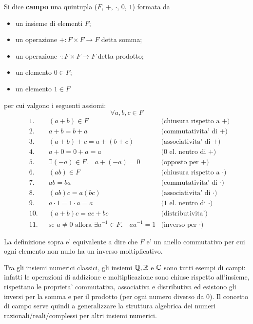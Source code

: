 \begin{definition}
    Si dice \textbf{campo} una quintupla ($F$, $+$, $\cdot$, $0$, $1$) formata da
    \begin{itemize}
        \item un insieme di elementi $F$;
        \item un operazione $+ : F \times F \to F$ detta somma;
        \item un operazione $\cdot : F \times F \to F$ detta prodotto;
        \item un elemento $0 \in F$;
        \item un elemento $1 \in F$
    \end{itemize}  per cui valgono i seguenti assiomi: \[
        \forall a, b, c \in F    
    \]
    \begin{align}
        &\text{1.}      &&(a+b) \in F           &\text{(chiusura rispetto a $+$)}\\
        &\text{2.}      &&a+b = b+a             &\text{(commutativita' di $+$)}\\
        &\text{3.}      &&(a+b)+c = a+(b+c)     &\text{(associativita' di $+$)}\\
        &\text{4.}      &&a+0=0+a=a             &\text{(0 el. neutro di $+$)}\\
        &\text{5.}      &&\exists (-a) \in F. \quad a+(-a) = 0 &\text{(opposto per $+$)}\\
        &\text{6.}      &&(ab) \in F            &\text{(chiusura rispetto a $\cdot$)}\\        
        &\text{7.}      &&ab = ba               &\text{(commutativita' di $\cdot$)}\\
        &\text{8.}      &&(ab)c = a(bc)         &\text{(associativita' di $\cdot$)}\\
        &\text{9.}      &&a \cdot 1=1 \cdot a=a &\text{(1 el. neutro di $\cdot$)}\\
        &\text{10.}     &&(a+b)c = ac + bc      &\text{(distributivita')} \\
        &\text{11.}     &&\text{se } a \neq 0 \text{ allora } \exists a^{-1} \in F. \quad aa^{-1} = 1 &\text{(inverso per $\cdot$)}
    \end{align}

    La definizione sopra e' equivalente a dire che $F$ e' un anello commutativo per cui ogni elemento non nullo ha un inverso moltiplicativo.
\end{definition}

Tra gli insiemi numerici classici, gli insiemi $\mathbb{Q}, \mathbb{R}$ e $\mathbb{C}$ sono tutti esempi di campi: infatti le operazioni di addizione e moltiplicazione sono chiuse rispetto all'insieme, rispettano le proprieta' commutativa, associativa e distributiva ed esistono gli inversi per la somma e per il prodotto (per ogni numero diverso da $0$). Il concetto di campo serve quindi a generalizzare la struttura algebrica dei numeri razionali/reali/complessi per altri insiemi numerici.

